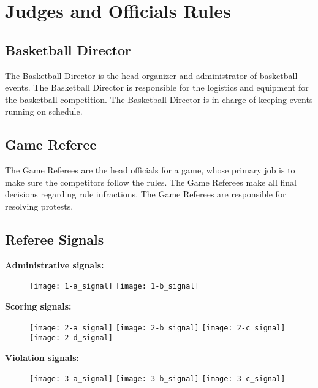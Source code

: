 \chapter{Judges and Officials Rules}

\section{Basketball Director}

The Basketball Director is the head organizer and administrator of basketball events.
The Basketball Director is responsible for the logistics and equipment for the basketball competition.
The Basketball Director is in charge of keeping events running on schedule.

\section{Game Referee}

The Game Referees are the head officials for a game, whose primary job is to make sure the competitors follow the rules.
The Game Referees make all final decisions regarding rule infractions.
The Game Referees are responsible for resolving protests.

\newpage
\section{Referee Signals}

\textbf{Administrative signals:}

\begin{figure}[h]
\texttt{[image: 1-a\_signal]}
\texttt{[image: 1-b\_signal]}
\end{figure}

\textbf{Scoring signals:}
\begin{figure}[h]
\texttt{[image: 2-a\_signal]}
\texttt{[image: 2-b\_signal]}
\texttt{[image: 2-c\_signal]}
\texttt{[image: 2-d\_signal]}
\end{figure}

\textbf{Violation signals:}

\begin{figure}[h]
\texttt{[image: 3-a\_signal]}
\texttt{[image: 3-b\_signal]}
\texttt{[image: 3-c\_signal]}
\end{figure}
